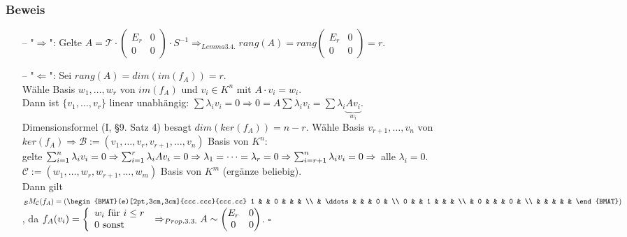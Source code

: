 \documentclass[a4paper, 12pt]{extarticle}
\newcommand{\tn}[1]{\textnormal {#1}}
\begin{document}
\subsubsection*{Beweis}
\begin{itemize}
	\item[--] "$\Rightarrow$": Gelte $A = \mathcal{T} \cdot \left(\begin{matrix}
		E_r & 0\\
		0 & 0
	\end{matrix}\right) \cdot S^{-1} \Rightarrow_{Lemma 3.4.} rang(A) = rang\left(\begin{matrix}
	E_r & 0 \\
	0 & 0
\end{matrix}\right) = r$.
\item[--] "$\Leftarrow$": Sei $rang(A) = dim(im(f_A)) = r$.\\ Wähle Basis $w_1, \dots, w_r$ von $im(f_A)$ und $v_i \in K^n$ mit $A \cdot v_i = w_i$.\\ Dann ist $\{v_1, \dots, v_r\}$ linear unabhängig: $\sum \lambda_i v_i = 0 \Rightarrow 0 = A\sum \lambda_i v_i = \sum \lambda_i \underbrace{Av_i}_{w_i}$.\\ Dimensionsformel (I, §9. Satz 4) besagt $dim(ker(f_A)) = n - r$. Wähle Basis $v_{r+1}, \dots, v_n$ von $ker(f_A) \Rightarrow \mathcal{B} := (v_1, \dots, v_r, v_{r+1}, \dots, v_n)$ Basis von $K^n$:\\ gelte $\sum_{i=1}^{n} \lambda_i v_i = 0 \Rightarrow \sum_{i=1}^r \lambda_i Av_i = 0 \Rightarrow \lambda_1 = \dots = \lambda_r = 0 \Rightarrow \sum_{i=r+1}^n \lambda_i v_i = 0\\ \Rightarrow$ alle $\lambda_i = 0$.\\
$\mathcal{C} := (w_1, \dots, w_r, w_{r+1}, \dots, w_m)$ Basis von $K^m$ (ergänze beliebig).\\
Dann gilt ${_\mathcal B}M_\mathcal{C}(f_A) = \left(
\begin{BMAT}(e)[2pt,3cm,3cm]{ccc.ccc}{ccc.cc}
	1 & & 0 & & & \\
	& \ddots & & & 0 & \\
	0 & & 1 & & & \\
	& 0 & & & 0 & \\
	& & & & & 
\end{BMAT}
\right)$, da $f_A(v_i) = \left \{\begin{array}{ll}
	w_i \tn{ für } i \leq r\\
	0 \tn{ sonst}
\end{array}\right.\\ \Rightarrow_{Prop. 3.3.} A \sim \left( \begin{matrix}
E_r & 0\\
0&0
\end{matrix}\right)$. $\square$
\end{itemize}
\end{document}
